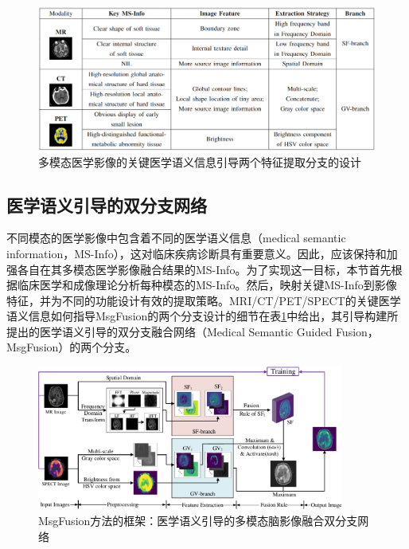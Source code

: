 \fi
    \begin{figure}[htb]
      \centering
          \includegraphics[width=0.9\columnwidth]{figs/paper1semanticfeature.png}
          \caption{多模态医学影像的关键医学语义信息引导两个特征提取分支的设计}\label{paper1semanticfeature}
     \end{figure}
    
\subsection{医学语义引导的双分支网络}
不同模态的医学影像中包含着不同的医学语义信息（medical semantic information，MS-Info），这对临床疾病诊断具有重要意义。因此，应该保持和加强各自在其多模态医学影像融合结果的MS-Info。为了实现这一目标，本节首先根据临床医学和成像理论分析每种模态的MS-Info。然后，映射关键MS-Info到影像特征，并为不同的功能设计有效的提取策略。MRI/CT/PET/SPECT的关键医学语义信息如何指导MsgFusion的两个分支设计的细节在表\ref{paper1semanticfeature}中给出，其引导构建所提出的医学语义引导的双分支融合网络（Medical Semantic Guided Fusion，MsgFusion）的两个分支。

 \begin{figure}[htb]
  \centering  %
      \includegraphics[width=0.9\textwidth]{figs/paper1framework_20221225.pdf}
      \caption{MsgFusion方法的框架：医学语义引导的多模态脑影像融合双分支网络}
      \label{paper1Framework}
 \end{figure}
 
